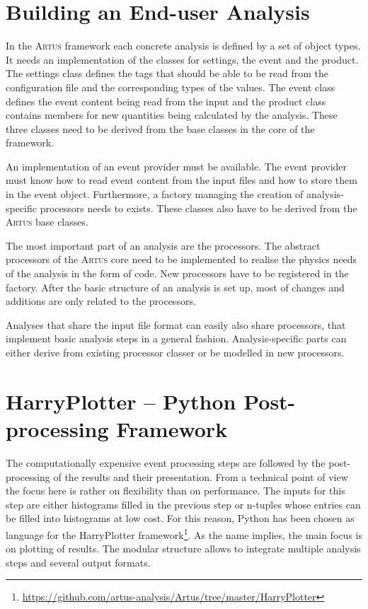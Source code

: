 \documentclass[3p]{elsarticle}
\newcommand{\software}[1]{\textsc{#1}\xspace}
\newcommand{\artus}{\software{Artus}}
\begin{document}
\section{Building an End-user Analysis \label{section_artus_analysis}}

In the \artus framework each concrete analysis is defined by a set of object types. It needs an implementation of the classes for settings, the event and the product. The settings class defines the tags that should be able to be read from the configuration file and the corresponding types of the values. The event class defines the event content being read from the input and the product class contains members for new quantities being calculated by the analysis. These three classes need to be derived from the base classes in the core of the framework.

An implementation of an event provider must be available. The event provider must know how to read event content from the input files and how to store them in the event object. Furthermore, a factory managing the creation of analysis-specific processors needs to exists. These classes also have to be derived from the \artus base classes.

The most important part of an analysis are the processors. The abstract processors of the \artus core need to be implemented to realise the physics needs of the analysis in the form of code. New processors have to be registered in the factory. After the basic structure of an analysis is set up, most of changes and additions are only related to the processors.

Analyses that share the input file format can easily also share processors, that implement basic analysis steps in a general fashion. Analysis-specific parts can either derive from existing processor classer or be modelled in new processors.


\section{HarryPlotter -- Python Post-processing Framework \label{section_artus_harryplotter}}

The computationally expensive event processing steps are followed by the post-processing of the results and their presentation. From a technical point of view the focus here is rather on flexibility than on performance. The inputs for this step are either histograms filled in the previous step or n-tuples whose entries can be filled into histograms at low cost. For this reason, Python has been chosen as language for the HarryPlotter framework\footnote{\url{https://github.com/artus-analysis/Artus/tree/master/HarryPlotter}}. As the name implies, the main focus is on plotting of results. The modular structure allows to integrate multiple analysis steps and several output formats.
\end{document}
